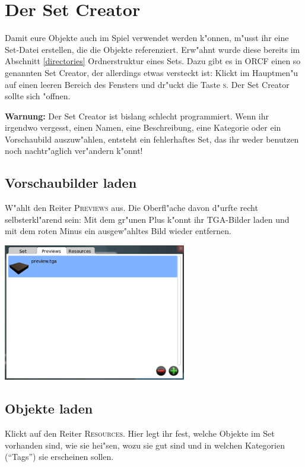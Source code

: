 \documentclass[a4paper]{article}
\newcommand{\ccaption}[1]{\textsc{#1}}
\newcommand{\warning}[1]{\textbf{Warnung:} #1 \par}
\begin{document}
\section{Der Set Creator}
\label{setcreator}
Damit eure Objekte auch im Spiel verwendet werden k"onnen, m"usst ihr eine Set-Datei erstellen, die die Objekte referenziert. Erw"ahnt wurde diese
bereits im Abschnitt \ref{directories} Ordnerstruktur eines Sets. Dazu gibt es in ORCF einen so genannten Set Creator, der allerdings etwas versteckt
ist: Klickt im Hauptmen"u auf einen leeren Bereich des Fensters und dr"uckt die Taste \ccaption{s}. Der Set Creator sollte sich "offnen.

\warning{Der Set Creator ist bislang schlecht programmiert. Wenn ihr irgendwo vergesst, einen Namen, eine Beschreibung, eine Kategorie oder ein
Vorschaubild auszuw"ahlen, entsteht ein fehlerhaftes Set, das ihr weder benutzen noch nachtr"aglich ver"andern k"onnt!}

\subsection{Vorschaubilder laden}
W"ahlt den Reiter \ccaption{Previews} aus. Die Oberfl"ache davon d"urfte recht selbsterkl"arend sein: Mit dem gr"unen Plus k"onnt ihr TGA-Bilder laden
und mit dem roten Minus ein ausgew"ahltes Bild wieder entfernen.

\begin{center}
\includegraphics[width=80mm]{../images/setcreator/previews.png}
\end{center}

\subsection{Objekte laden}
Klickt auf den Reiter \ccaption{Resources}. Hier legt ihr fest, welche Objekte im Set vorhanden sind, wie sie hei"sen, wozu sie gut sind und in welchen
Kategorien ("`Tags"') sie erscheinen sollen.
\end{document}
